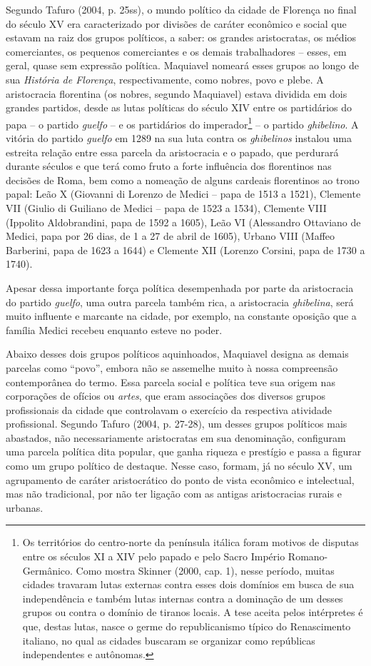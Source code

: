 Segundo Tafuro (2004, p. 25ss), o mundo político da cidade de Florença
no final do século XV era caracterizado por divisões de caráter
econômico e social que estavam na raiz dos grupos políticos, a saber: os
grandes aristocratas, os médios comerciantes, os pequenos comerciantes e
os demais trabalhadores -- esses, em geral, quase sem expressão
política. Maquiavel nomeará esses grupos ao longo de sua \emph{História
de Florença}, respectivamente, como nobres, povo e plebe. A aristocracia
florentina (os nobres, segundo Maquiavel) estava dividida em dois
grandes partidos, desde as lutas políticas do século XIV entre os
partidários do papa -- o partido \emph{guelfo} -- e os partidários do
imperador\footnote{Os territórios do centro-norte da península itálica
  foram motivos de disputas entre os séculos XI a XIV pelo papado e pelo
  Sacro Império Romano-Germânico. Como mostra Skinner (2000, cap. 1),
  nesse período, muitas cidades travaram lutas externas contra esses
  dois domínios em busca de sua independência e também lutas internas
  contra a dominação de um desses grupos ou contra o domínio de tiranos
  locais. A tese aceita pelos intérpretes é que, destas lutas, nasce o
  germe do republicanismo típico do Renascimento italiano, no qual as
  cidades buscaram se organizar como repúblicas independentes e
  autônomas.} -- o partido \emph{ghibelino}. A vitória do partido
\emph{guelfo} em 1289 na sua luta contra os \emph{ghibelinos} instalou
uma estreita relação entre essa parcela da aristocracia e o papado, que
perdurará durante séculos e que terá como fruto a forte influência dos
florentinos nas decisões de Roma, bem como a nomeação de alguns cardeais
florentinos ao trono papal: Leão X (Giovanni di Lorenzo de Medici --
papa de 1513 a 1521), Clemente VII (Giulio di Guiliano de Medici -- papa
de 1523 a 1534), Clemente VIII (Ippolito Aldobrandini, papa de 1592 a
1605), Leão VI (Alessandro Ottaviano de Medici, papa por 26 dias, de 1 a
27 de abril de 1605), Urbano VIII (Maffeo Barberini, papa de 1623 a
1644) e Clemente XII (Lorenzo Corsini, papa de 1730 a 1740).

Apesar dessa importante força política desempenhada por parte da
aristocracia do partido \emph{guelfo}, uma outra parcela também rica, a
aristocracia \emph{ghibelina}, será muito influente e marcante na
cidade, por exemplo, na constante oposição que a família Medici recebeu
enquanto esteve no poder.

Abaixo desses dois grupos políticos aquinhoados, Maquiavel designa as
demais parcelas como ``povo'', embora não se assemelhe muito à nossa
compreensão contemporânea do termo. Essa parcela social e política teve
sua origem nas corporações de ofícios ou \emph{artes}, que eram
associações dos diversos grupos profissionais da cidade que controlavam
o exercício da respectiva atividade profissional. Segundo Tafuro (2004,
p. 27-28), um desses grupos políticos mais abastados, não
necessariamente aristocratas em sua denominação, configuram uma parcela
política dita popular, que ganha riqueza e prestígio e passa a figurar
como um grupo político de destaque. Nesse caso, formam, já no século XV,
um agrupamento de caráter aristocrático do ponto de vista econômico e
intelectual, mas não tradicional, por não ter ligação com as antigas
aristocracias rurais e urbanas.

